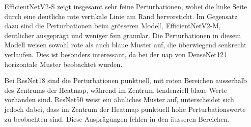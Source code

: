 EfficientNetV2-S zeigt insgesamt sehr feine Perturbationen, wobei die linke Seite durch eine deutliche rote vertikale Linie am Rand hervorsticht. Im Gegensatz dazu sind die Perturbationen beim grösseren Modell, EfficientNetV2-M, deutlicher ausgeprägt und weniger fein granular. Die Perturbationen in diesem Modell weisen sowohl rote als auch blaue Muster auf, die überwiegend senkrecht verlaufen. Dies ist besonders interessant, da bei der \acrshort{uap} von DenseNet121 horizontale Muster beobachtet wurden.

Bei ResNet18 sind die Perturbationen punktuell, mit roten Bereichen ausserhalb des Zentrums der Heatmap, während im Zentrum tendenziell blaue Werte vorhanden sind. ResNet50 weist ein ähnliches Muster auf, unterscheidet sich jedoch dabei, dass im Zentrum der Heatmap punktuell hohe Perturbationswerte zu beobachten sind. Diese Ausprägungen fehlen in den äusseren Bereichen.

